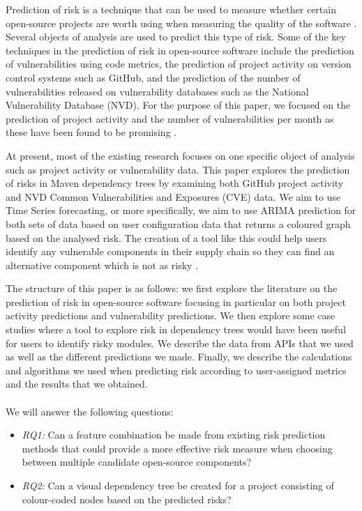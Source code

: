 \documentclass[conference]{IEEEtran}
\begin{document}
Prediction of risk is a technique that can be used to measure whether certain open-source projects are worth using when measuring the quality of the software \cite{abunadi_towards_2015}. Several objects of analysis are used to predict this type of risk. Some of the key techniques in the prediction of risk in open-source software include the prediction of vulnerabilities using code metrics, the prediction of project activity on version control systems such as GitHub, and the prediction of the number of vulnerabilities released on vulnerability databases such as the National Vulnerability Database (NVD). For the purpose of this paper, we focused on the prediction of project activity and the number of vulnerabilities per month as these have been found to be promising \cite{xia_predicting_2022, s_wu_vulnerability_2020}. 

At present, most of the existing research focuses on one specific object of analysis such as project activity or vulnerability data. This paper explores the prediction of risks in Maven dependency trees by examining both GitHub project activity and NVD Common Vulnerabilities and Exposures (CVE) data. We aim to use Time Series forecasting, or more specifically, we aim to use ARIMA prediction for both sets of data based on user configuration data that returns a coloured graph based on the analysed risk. The creation of a tool like this could help users identify any vulnerable components in their supply chain so they can find an alternative component which is not as risky \cite{noauthor_open_nodate}. 

The structure of this paper is as follows: we first explore the literature on the prediction of risk in open-source software focusing in particular on both project activity predictions and vulnerability predictions. We then explore some case studies where a tool to explore risk in dependency trees would have been useful for users to identify risky modules. We describe the data from APIs that we used as well as the different predictions we made. Finally, we describe the calculations and algorithms we used when predicting risk according to user-assigned metrics and the results that we obtained. 
\\\\
We will answer the following questions:\\

\begin{itemize}
    \item \textit{RQ1:} Can a feature combination be made from existing risk prediction methods that could provide a more effective risk measure when choosing between multiple candidate open-source components?\\
    \item \textit{RQ2:} Can a visual dependency tree be created for a project consisting of colour-coded nodes based on the predicted risks?\\
\end{itemize}
\end{document}
